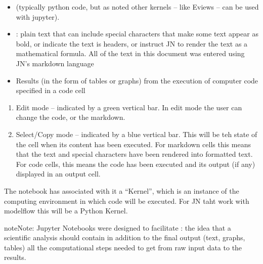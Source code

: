 \documentclass[letterpaper,10pt,english]{jupyterBook}
\begin{document}
\sphinxAtStartPar
{}
\begin{itemize}
\item {} 
\sphinxAtStartPar
{} (typically python code, but as noted other kernels – like Eviews – can be used with jupyter).

\item {} 
\sphinxAtStartPar
{}: plain text that can include special characters that make some text appear as bold, or indicate the text is headers, or instruct JN to render the text as a mathematical formula.  All of the text in this document was entered using JN’s markdown language

\item {} 
\sphinxAtStartPar
Results (in the form of tables or graphs) from the execution of computer code specified in a code cell

\end{itemize}

\sphinxAtStartPar
{}
\begin{enumerate}
%
\item {} 
\sphinxAtStartPar
Edit mode – indicated by a green vertical bar. In edit mode the user can change the code, or the markdown.

\item {} 
\sphinxAtStartPar
Select/Copy mode – indicated by a blue vertical bar.  This will be teh state of the cell when its content has been executed.  For markdown cells this means that the text and special characters have been rendered into formatted text.  For code cells, this means the code has been executed and its output (if any) displayed in an output cell.

\end{enumerate}

\sphinxAtStartPar
The notebook has associated with it a “Kernel”, which is an instance of the computing environment in which code will be executed. For JN taht work with modelflow this will be a Python Kernel.

\begin{sphinxadmonition}{note}{Note:}
\sphinxAtStartPar
Jupyter Notebooks were designed to facilitate : the idea that a scientific analysis should contain \sphinxhyphen{} in addition to the final output (text, graphs, tables) \sphinxhyphen{} all the computational steps needed to get from raw input data to the results.
\end{sphinxadmonition}
\end{document}
